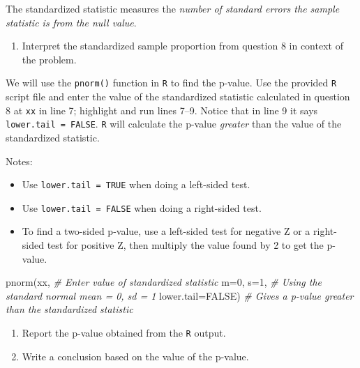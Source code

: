 \documentclass[
]{report}
\newenvironment{Shaded}{\begin{snugshade}}{\end{snugshade}}
\newcommand{\AttributeTok}[1]{\textcolor[rgb]{0.77,0.63,0.00}{#1}}
\newcommand{\CommentTok}[1]{\textcolor[rgb]{0.56,0.35,0.01}{\textit{#1}}}
\newcommand{\ConstantTok}[1]{\textcolor[rgb]{0.00,0.00,0.00}{#1}}
\newcommand{\DecValTok}[1]{\textcolor[rgb]{0.00,0.00,0.81}{#1}}
\newcommand{\FunctionTok}[1]{\textcolor[rgb]{0.00,0.00,0.00}{#1}}
\newcommand{\NormalTok}[1]{#1}
\providecommand{\tightlist}{%
  \setlength{\itemsep}{0pt}\setlength{\parskip}{0pt}}
\begin{document}
\vspace{0.2in}

The standardized statistic measures the \emph{number of standard errors the sample statistic is from the null value}.

\begin{enumerate}
\def\labelenumi{\arabic{enumi}.}
\setcounter{enumi}{9}
\tightlist
\item
  Interpret the standardized sample proportion from question 8 in context of the problem.
\end{enumerate}

\vspace{.8in}

\newpage

We will use the \texttt{pnorm()} function in \texttt{R} to find the p-value. Use the provided \texttt{R} script file and enter the value of the standardized statistic calculated in question 8 at \texttt{xx} in line 7; highlight and run lines 7--9. Notice that in line 9 it says \texttt{lower.tail\ =\ FALSE}. \texttt{R} will calculate the p-value \emph{greater} than the value of the standardized statistic.

Notes:

\begin{itemize}
\tightlist
\item
  Use \texttt{lower.tail\ =\ TRUE} when doing a left-sided test.
\item
  Use \texttt{lower.tail\ =\ FALSE} when doing a right-sided test.
\item
  To find a two-sided p-value, use a left-sided test for negative Z or a right-sided test for positive Z, then multiply the value found by 2 to get the p-value.
\end{itemize}

\begin{Shaded}
\begin{Highlighting}[]
\FunctionTok{pnorm}\NormalTok{(xx, }\CommentTok{\# Enter value of standardized statistic}
      \AttributeTok{m=}\DecValTok{0}\NormalTok{, }\AttributeTok{s=}\DecValTok{1}\NormalTok{, }\CommentTok{\# Using the standard normal mean = 0, sd = 1}
      \AttributeTok{lower.tail=}\ConstantTok{FALSE}\NormalTok{) }\CommentTok{\# Gives a p{-}value greater than the standardized statistic}
\end{Highlighting}
\end{Shaded}

\begin{enumerate}
\def\labelenumi{\arabic{enumi}.}
\setcounter{enumi}{10}
\item
  Report the p-value obtained from the \texttt{R} output.
  \vspace{0.2in}
\item
  Write a conclusion based on the value of the p-value.
  \vspace{0.8in}
\end{enumerate}
\end{document}
